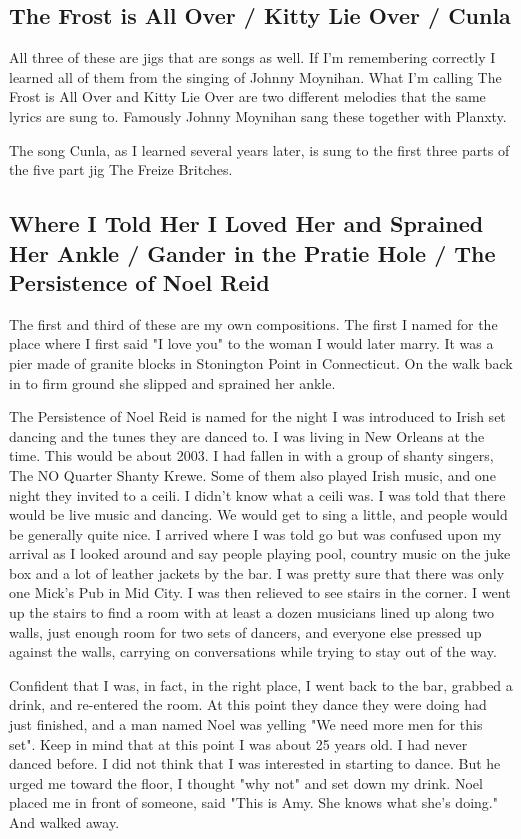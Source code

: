 \documentclass[11pt,letterpaper]{article}
\begin{document}
\subsection*{The Frost is All Over / Kitty Lie Over / Cunla}

All three of these are jigs that are songs as well. If I'm remembering correctly I learned all of them from the singing of Johnny Moynihan. What I'm calling The Frost is All Over and Kitty Lie Over are two different melodies that the same lyrics are sung to. Famously Johnny Moynihan sang these together with Planxty. 

The song Cunla, as I learned several years later, is sung to the first three parts of the five part jig The Freize Britches.

\subsection*{Where I Told Her I Loved Her and Sprained Her Ankle / Gander in the Pratie Hole / The Persistence of Noel Reid}

The first and third of these are my own compositions. The first I named for the place where I first said "I love you" to the woman I would later marry. It was a pier made of granite blocks in Stonington Point in Connecticut. On the walk back in to firm ground she slipped and sprained her ankle. 

The Persistence of Noel Reid is named for the night I was introduced to Irish set dancing and the tunes they are danced to. I was living in New Orleans at the time. This would be about 2003. I had fallen in with a group of shanty singers, The NO Quarter Shanty Krewe. Some of them also played Irish music, and one night they invited to a ceili. I didn't know what a ceili was. I was told that there would be live music and dancing. We would get to sing a little, and people would be generally quite nice. 
I arrived where I was told go but was confused upon my arrival as I looked around and say people playing pool, country music on the juke box and a lot of leather jackets by the bar. I was pretty sure that there was only one Mick's Pub in Mid City. I was then relieved to see stairs in the corner. I went up the stairs to find a room with at least a dozen musicians lined up along two walls, just enough room for two sets of dancers, and everyone else pressed up against the walls, carrying on conversations while trying to stay out of the way. 

Confident that I was, in fact, in the right place, I went back to the bar, grabbed a drink, and re-entered the room. At this point they dance they were doing had just finished, and a man named Noel was yelling "We need more men for this set". Keep in mind that at this point I was about 25 years old. I had never danced before. I did not think that I was interested in starting to dance. But he urged me toward the floor, I thought "why not" and set down my drink. Noel placed me in front of someone, said "This is Amy. She knows what she's doing." And walked away. 
\end{document}
